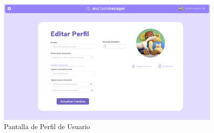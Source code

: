 \documentclass{pretexto/report}
\begin{document}
\begin{figure}[H]
    \centering
    \includegraphics[width=\linewidth]{pantallas/Editar Perfil.png}
    \caption{Pantalla de Perfil de Usuario}
\end{figure}

\pagestyle{fancy}



\pagebreak
\printbibliography[heading=bibintoc]
\end{document}
